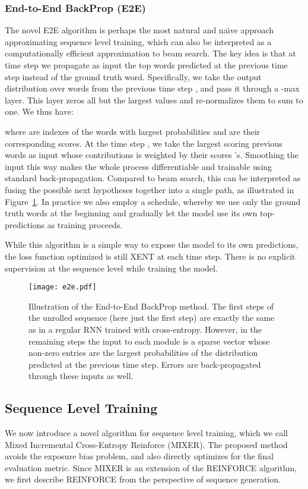 \documentclass{article} \usepackage{iclr2016_conference,times}
\begin{document}
\subsubsection{End-to-End BackProp (E2E)} 
\label{model-e2e}
The novel E2E algorithm is perhaps the most natural and na\"{\i}ve approach approximating sequence level training, which can also be interpreted as a computationally efficient approximation to beam search. 
The key idea is that at time step  we propagate as input the top  words predicted at the previous time step instead of the ground truth word. 
Specifically, we take the output distribution over words from the previous time step , and pass it through a -max layer. 
This layer zeros all but the  largest values and re-normalizes 
them to sum to one. We thus have: 

where  are indexes of the words with  largest probabilities and  are their corresponding scores. 
At the time step , we take the  largest scoring previous words as input whose 
contributions is weighted by their scores 's. 
Smoothing the input this way makes the whole process 
differentiable and trainable using standard back-propagation.
Compared to beam search, this can be interpreted as fusing the  possible next 
hypotheses together into a single path, as illustrated in Figure~\ref{fig:e2e}. 
In practice we also employ a schedule, whereby we use only the ground truth words 
at the beginning and gradually let the model use its own top- predictions as training proceeds. 


While this algorithm is a simple way to expose the model to its own predictions, the loss function optimized is still XENT at each time step. 
There is no explicit supervision at the sequence level while training the model. 
\begin{figure}[!t]
\begin{center}
\texttt{[image: e2e.pdf]}
\end{center}
\caption{Illustration of the End-to-End BackProp method. The first 
  steps of the unrolled sequence (here just the first step) are exactly the same
  as in a regular RNN trained with cross-entropy. However, in the remaining
  steps the input to each module is a sparse
  vector whose non-zero entries are the  largest probabilities
  of the distribution predicted at the previous time step. Errors are
  back-propagated through these inputs as well.}
\label{fig:e2e}
\end{figure}

\subsection{Sequence Level Training}
We now introduce a novel algorithm for sequence level training, which we call Mixed Incremental Cross-Entropy Reinforce (MIXER). The proposed method avoids the exposure bias problem, 
and also directly optimizes for the final evaluation metric. 
Since MIXER is an extension of the REINFORCE algorithm, we first describe REINFORCE 
from the perspective of sequence generation. 
\end{document}

